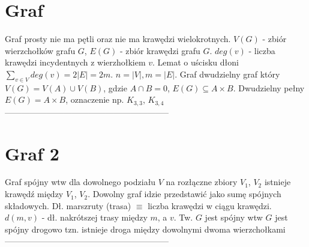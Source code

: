 \documentclass{article}
\begin{document}
\begin{minipage}[t]{.33\textwidth}
\section*{Graf}
Graf prosty nie ma pętli oraz nie ma krawędzi wielokrotnych. $V(G)$ - zbiór wierzchołków grafu $G$, $E(G)$ - zbiór krawędzi grafu $G$. $deg(v)$ - liczba krawędzi incydentnych z wierzhołkiem $v$. Lemat o uścisku dłoni $\sum_{v\in V}deg(v) = 2|E| = 2m$. $n = |V|, m = |E|$. Graf dwudzielny graf który $V(G) = V(A) \cup V(B)$, gdzie $A\cap B = 0$, $E(G) \subseteq A\times B$. Dwudzielny pełny $E(G) = A\times B$, oznaczenie np. $K_{3,3}$, $K_{3,4}$
\\-----------------------------------------------------------
\section*{Graf 2}
Graf spójny wtw dla dowolnego podziału $V$ na rozłączne zbiory $V_1$, $V_2$ istnieje krawędź między $V_1$, $V_2$.
Dowolny graf idzie przedstawić jako sumę spójnych składowych. Dł. marszruty (trasa) $\equiv$ liczba krawędzi w ciągu krawędzi. $d(m,v)$ - dł. nakrótszej trasy między $m$, a $v$.
Tw. $G$ jest spójny wtw $G$ jest spójny drogowo tzn. istnieje droga między dowolnymi dwoma wierzchołkami
\\-----------------------------------------------------------
\end{minipage}
\end{document}

